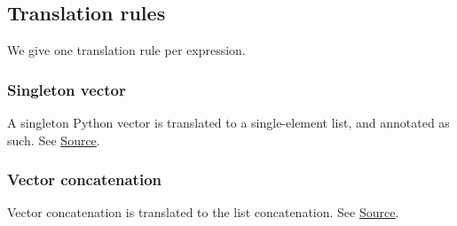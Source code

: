 \subsection{Translation rules}

We give one translation rule per expression.

\subsubsection{Singleton vector}




\begin{mathpar}
\end{mathpar}

A singleton Python vector is translated to a single-element list, and annotated
as such. See
\href{https://github.com/saltiniroberto/ssf/blob/7ea6e18093d9da3154b4e396dd435549f687e6b9/high_level/common/pythonic_code_generic.py#L15-L16}{Source}.

\subsubsection{Vector concatenation}




\begin{mathpar}
\end{mathpar}

Vector concatenation is translated to the list concatenation. See
\href{https://github.com/saltiniroberto/ssf/blob/7ea6e18093d9da3154b4e396dd435549f687e6b9/high_level/common/pythonic_code_generic.py#L19-L20}{Source}.

